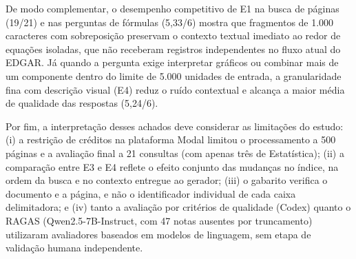 De modo complementar, o desempenho competitivo de E1 na busca de páginas (19/21) e nas perguntas de fórmulas (5,33/6) mostra que fragmentos de 1.000 caracteres com sobreposição preservam o contexto textual imediato ao redor de equações isoladas, que não receberam registros independentes no fluxo atual do EDGAR. Já quando a pergunta exige interpretar gráficos ou combinar mais de um componente dentro do limite de 5.000 unidades de entrada, a granularidade fina com descrição visual (E4) reduz o ruído contextual e alcança a maior média de qualidade das respostas (5,24/6).

Por fim, a interpretação desses achados deve considerar as limitações do estudo: (i) a restrição de créditos na plataforma Modal limitou o processamento a 500 páginas e a avaliação final a 21 consultas (com apenas três de Estatística); (ii) a comparação entre E3 e E4 reflete o efeito conjunto das mudanças no índice, na ordem da busca e no contexto entregue ao gerador; (iii) o gabarito verifica o documento e a página, e não o identificador individual de cada caixa delimitadora; e (iv) tanto a avaliação por critérios de qualidade (Codex) quanto o RAGAS (Qwen2.5-7B-Instruct, com 47 notas ausentes por truncamento) utilizaram avaliadores baseados em modelos de linguagem, sem etapa de validação humana independente.
